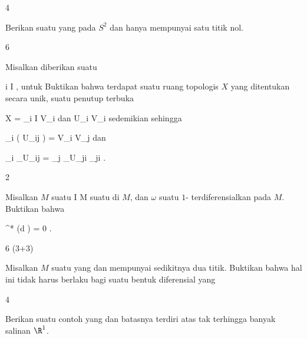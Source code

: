 {4}
{

Berikan suatu
 yang
pada $S^2$ dan hanya mempunyai satu titik nol.

}
{} {}

{6}
{

Misalkan diberikan suatu

 {}
 {i \in I} {}
 {} {} {} {,}
untuk
Buktikan bahwa terdapat suatu ruang topologis $X$ yang ditentukan secara unik, suatu penutup terbuka

\mavergleichskette
{\vergleichskette
{ X
}
{ = }{ \bigcup_{i \in I} V_i
}
{  }{
}
{    }{
}
{   }{
}
}
{}{}{}
dan
 {U_i } { V_i
} {}
sedemikian sehingga

\mavergleichskettedisp
{\vergleichskette
{ \psi_i  \left(  U_{ij}  \right)
}
{ =} { V_i \cap V_j
}
{ } {
}
{ } {
}
{ } {
}
}
{}{}{}
dan

\mavergleichskettedisp
{\vergleichskette
{ \psi_i \vert_{U_{ij} }
}
{ =} { \psi_j \vert_{U_{ji} }  \circ   \varphi_{ji}
}
{ } {
}
{ } {
}
{ } {
}
}
{}{}{}.

}
{} {}

{2}
{

Misalkan $M$ suatu
\maabb {\gamma} { I } { M
} {}
suatu
di $M$, dan $\omega$ suatu
$1$-
terdiferensialkan pada $M$. Buktikan bahwa

\mavergleichskettedisp
{\vergleichskette
{ \gamma^* (d \omega)
}
{ =} { 0
}
{ } {
}
{ } {
}
{ } {
}
}
{}{}{}.

}
{} {}

{6 (3+3)}
{

Misalkan $M$ suatu
yang
dan mempunyai sedikitnya dua titik.
 {Buktikan bahwa hal ini tidak harus berlaku bagi suatu bentuk diferensial yang
}

}
{} {}

{4}
{

Berikan suatu contoh
yang
dan batasnya terdiri atas
 {} {}
tak terhingga banyak salinan $\R^1$.

}
{} {}

